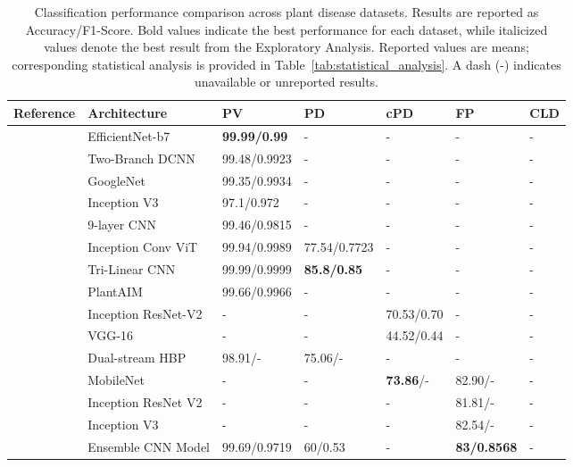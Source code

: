 \documentclass[sn-mathphys]{sn-jnl}
\theoremstyle{thmstyleone}%
\theoremstyle{thmstyletwo}%
\theoremstyle{thmstylethree}%
\begin{document}
\begin{table}[h!]
  \tiny
  \centering
\caption{Classification performance comparison across plant disease datasets. Results are reported as Accuracy/F1-Score. Bold values indicate the best performance for each dataset, while italicized values denote the best result from the Exploratory Analysis. Reported values are means; corresponding statistical analysis is provided in Table~\ref{tab:statistical_analysis}. A dash (-) indicates unavailable or unreported results.}

  \label{tab:classification_performance}
  \begin{tabular}{@{}p{2cm}p{1.5cm}p{1.2cm}p{1.2cm}p{1.2cm}p{1.2cm}p{1.2cm}@{}}
    \toprule
    \textbf{Reference} & \textbf{Architecture} & \textbf{PV} & \textbf{PD} & \textbf{cPD} & \textbf{FP} & \textbf{CLD} \\
    \midrule 
    \citet{bruno2022improving} & EfficientNet-b7 & \textbf{99.99/0.99} & - & - & - & - \\
    \citet{schuler2022color} & Two-Branch DCNN & 99.48/0.9923 & - & - & - & - \\
    \citet{singh2020plantdoc} & GoogleNet & 99.35/0.9934 & - & - & - & - \\
    \citet{toda2019convolutional} & Inception V3 & 97.1/0.972 & - & - & - & - \\
    \citet{geetharamani2019identification} & 9-layer CNN & 99.46/0.9815 & - & - & - & - \\
    \citet{yu2023inception} & Inception Conv ViT & 99.94/0.9989 & 77.54/0.7723 & - & - & - \\
    \citet{wang2021t} & Tri-Linear CNN & 99.99/0.9999 & \textbf{85.8/0.85} & - & - & - \\
    \citet{chai2025plantaim} & PlantAIM & 99.66/0.9966 & - & - & - & - \\
    \citet{singh2019plant} & Inception ResNet-V2 & - & - & 70.53/0.70 & - & - \\
    \citet{singh2019plant} & VGG-16 & - & - & 44.52/0.44 & - & - \\
    \citet{wang2022dhbp} & Dual-stream HBP & 98.91/- & 75.06/- & - & - & - \\
    \citet{moupojou2023fieldplant} & MobileNet & - & - & \textbf{73.86}/- & 82.90/- & - \\
    \citet{moupojou2023fieldplant} & Inception ResNet V2 & - & - & - & 81.81/- & - \\
    \citet{moupojou2023fieldplant} & Inception V3 & - & - & - & 82.54/- & - \\
    \citet{zubair2025robust} & Ensemble CNN Model & 99.69/0.9719 & 60/0.53 & - & \textbf{83/0.8568} & - \\
    

\end{tabular}
\end{table}
\end{document}
